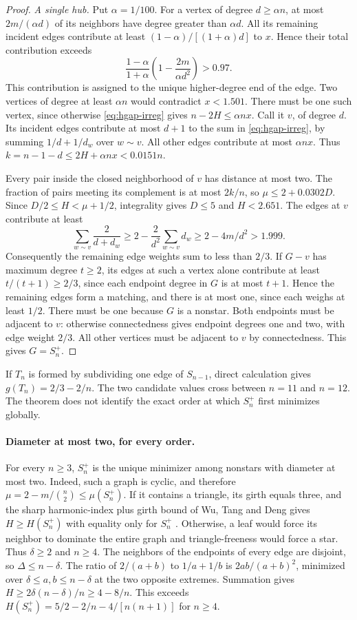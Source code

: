 \documentclass[11pt,a4paper]{article}
\begin{document}
\begin{proof}
\emph{A single hub.} Put $\alpha=1/100$. For a vertex of degree $d\ge\alpha n$, at most $2m/(\alpha d)$ of its neighbors have degree greater than $\alpha d$. All its remaining incident edges contribute at least $(1-\alpha)/[(1+\alpha)d]$ to $x$. Hence their total contribution exceeds
\[
 \frac{1-\alpha}{1+\alpha}\left(1-\frac{2m}{\alpha d^2}\right)>0.97.
\]
This contribution is assigned to the unique higher-degree end of the edge. Two vertices of degree at least $\alpha n$ would contradict $x<1.501$. There must be one such vertex, since otherwise \eqref{eq:hgap-irreg} gives $n-2H\le\alpha nx$. Call it $v$, of degree $d$. Its incident edges contribute at most $d+1$ to the sum in \eqref{eq:hgap-irreg}, by summing $1/d+1/d_w$ over $w\sim v$. All other edges contribute at most $\alpha nx$. Thus $k=n-1-d\le2H+\alpha nx<0.0151 n$.

Every pair inside the closed neighborhood of $v$ has distance at most two. The fraction of pairs meeting its complement is at most $2k/n$, so $\mu\le2+0.0302D$. Since $D/2\le H<\mu+1/2$, integrality gives $D\le5$ and $H<2.651$. The edges at $v$ contribute at least
\[
 \sum_{w\sim v}\frac{2}{d+d_w}\ge 2-\frac{2}{d^2}\sum_{w\sim v}d_w\ge2-4m/d^2>1.999.
\]
Consequently the remaining edge weights sum to less than $2/3$. If $G-v$ has maximum degree $t\ge2$, its edges at such a vertex alone contribute at least $t/(t+1)\ge2/3$, since each endpoint degree in $G$ is at most $t+1$. Hence the remaining edges form a matching, and there is at most one, since each weighs at least $1/2$. There must be one because $G$ is a nonstar. Both endpoints must be adjacent to $v$: otherwise connectedness gives endpoint degrees one and two, with edge weight $2/3$. All other vertices must be adjacent to $v$ by connectedness. This gives $G=S_n^+$.
\end{proof}

If $T_n$ is formed by subdividing one edge of $S_{n-1}$, direct calculation gives $g(T_n)=2/3-2/n$. The two candidate values cross between $n=11$ and $n=12$. The theorem does not identify the exact order at which $S_n^+$ first minimizes globally.

\paragraph{Diameter at most two, for every order.}
For every $n\ge3$, $S_n^+$ is the unique minimizer among nonstars with diameter at most two. Indeed, such a graph is cyclic, and therefore $\mu=2-m/\binom n2\le\mu(S_n^+)$. If it contains a triangle, its girth equals three, and the sharp harmonic-index plus girth bound of Wu, Tang and Deng gives $H\ge H(S_n^+)$ with equality only for $S_n^+$ \cite{hgapWu}. Otherwise, a leaf would force its neighbor to dominate the entire graph and triangle-freeness would force a star. Thus $\delta\ge2$ and $n\ge4$. The neighbors of the endpoints of every edge are disjoint, so $\Delta\le n-\delta$. The ratio of $2/(a+b)$ to $1/a+1/b$ is $2ab/(a+b)^2$, minimized over $\delta\le a,b\le n-\delta$ at the two opposite extremes. Summation gives $H\ge2\delta(n-\delta)/n\ge4-8/n$. This exceeds $H(S_n^+)=5/2-2/n-4/[n(n+1)]$ for $n\ge4$.
\end{document}
